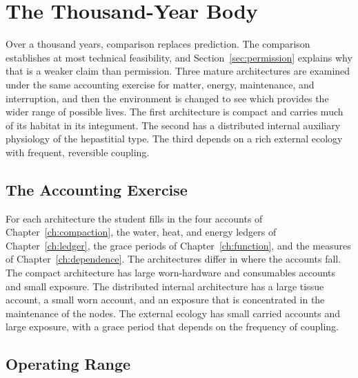 \documentclass[11pt,openany]{book}
\theoremstyle{definition}
\theoremstyle{remark}
\begin{document}
\chapter{The Thousand-Year Body}
\label{ch:thousand}

Over a thousand years, comparison replaces prediction. The comparison establishes at most technical feasibility, and Section~\ref{sec:permission} explains why that is a weaker claim than permission. Three mature architectures are examined under the same accounting exercise for matter, energy, maintenance, and interruption, and then the environment is changed to see which provides the wider range of possible lives. The first architecture is compact and carries much of its habitat in its integument. The second has a distributed internal auxiliary physiology of the hepastitial type. The third depends on a rich external ecology with frequent, reversible coupling.

\section{The Accounting Exercise}

For each architecture the student fills in the four accounts of Chapter~\ref{ch:compaction}, the water, heat, and energy ledgers of Chapter~\ref{ch:ledger}, the grace periods of Chapter~\ref{ch:function}, and the measures of Chapter~\ref{ch:dependence}. The architectures differ in where the accounts fall. The compact architecture has large worn-hardware and consumables accounts and small exposure. The distributed internal architecture has a large tissue account, a small worn account, and an exposure that is concentrated in the maintenance of the nodes. The external ecology has small carried accounts and large exposure, with a grace period that depends on the frequency of coupling.

\section{Operating Range}
\end{document}
